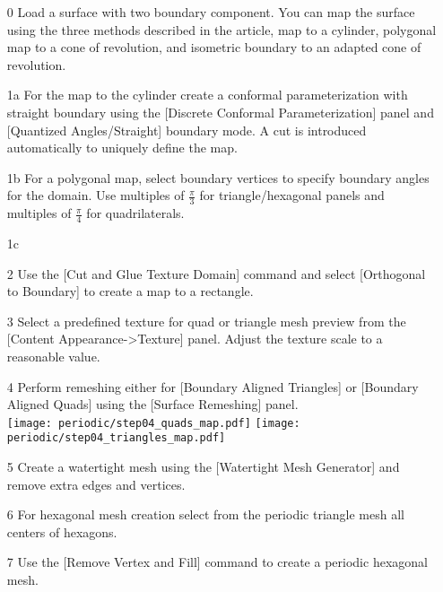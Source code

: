 \documentclass[Thesis.tex]{subfiles}
\begin{document}
\begin{itemize}
\item[0] Load a surface with two boundary component. You can map the surface using the three methods described in the article, map to a cylinder, polygonal map to a cone of revolution, and isometric boundary to an adapted cone of revolution.
\item[1a] For the map to the cylinder create a conformal parameterization with straight boundary using the [Discrete Conformal Parameterization] panel and [Quantized Angles/Straight] boundary mode. A cut is introduced automatically to uniquely define the map.
\item[1b] For a polygonal map, select boundary vertices to specify boundary angles for the domain. Use multiples of $\frac{\pi}{3}$ for triangle/hexagonal panels and multiples of $\frac{\pi}{4}$ for quadrilaterals.
\item[1c]
\item[2] Use the [Cut and Glue Texture Domain] command and select [Orthogonal to Boundary] to create a map to a rectangle.\\
\item[3] Select a predefined texture for quad or triangle mesh preview from the [Content Appearance->Texture] panel. Adjust the texture scale to a reasonable value.
\item[4] Perform remeshing either for [Boundary Aligned Triangles] or [Boundary Aligned Quads] using the [Surface Remeshing] panel.\\
\texttt{[image: periodic/step04\_quads\_map.pdf]}
\texttt{[image: periodic/step04\_triangles\_map.pdf]}
\item[5] Create a watertight mesh using the [Watertight Mesh Generator] and remove extra edges and vertices.
\item[6] For hexagonal mesh creation select from the periodic triangle mesh all centers of hexagons. 
\item[7] Use the [Remove Vertex and Fill] command to create a periodic hexagonal mesh.
\end{itemize}
\end{document}
